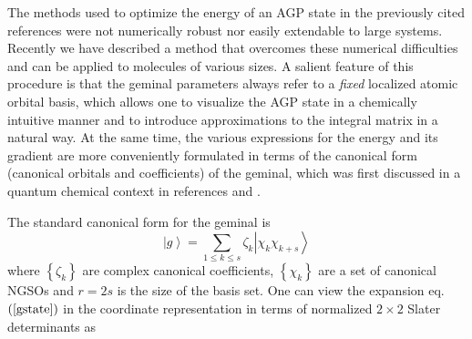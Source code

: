 \documentclass[preprint,aps,showkeys]{revtex4}%
\begin{document}
The methods used to optimize the energy of an AGP state in the previously
cited references were not numerically robust nor easily extendable to large
systems. Recently we have \cite{Weiner&Ortiz02} described a method that
overcomes these numerical difficulties and can be applied to molecules of
various sizes. A salient feature of this procedure is that the geminal
parameters always refer to a \emph{fixed} localized atomic orbital basis,
which allows one to visualize the AGP state in a chemically intuitive manner
and to introduce approximations to the integral matrix in a natural way. At
the same time, the various expressions for the energy and its gradient are
more conveniently formulated in terms of the canonical form (canonical
orbitals and coefficients) of the geminal, which was first discussed in a
quantum chemical context in references \cite{Coleman63} and \cite{Lowdin56}.

The standard canonical form for the geminal is
\begin{equation}
\left\vert g\right\rangle =\sum_{1\leq k\leq s}\zeta_{k}\left\vert \chi
_{k}\chi_{k+s}\right\rangle \label{gstate}%
\end{equation}
where $\left\{  \zeta_{k}\right\}  $ are complex canonical coefficients,
$\left\{  \chi_{k}\right\}  $ are a set of canonical NGSOs and $r=2s$ is the
size of the basis set. One can view the expansion eq. $\left(  \ref{gstate}%
\right)  $ in the coordinate representation in terms of normalized $2\times2$
Slater determinants as%
\end{document}
